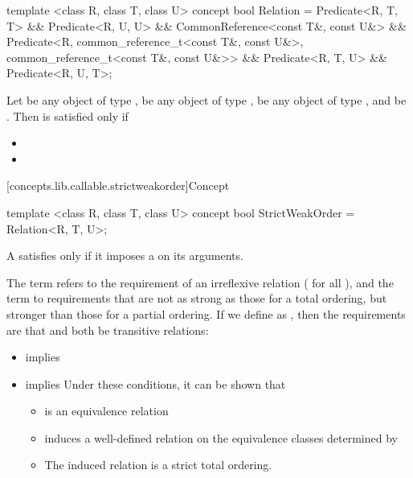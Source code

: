 %
\begin{itemdecl}
template <class R, class T, class U>
concept bool Relation =
  Predicate<R, T, T> &&
  Predicate<R, U, U> &&
  CommonReference<const T&, const U&> &&
  Predicate<R,
    common_reference_t<const T&, const U&>,
    common_reference_t<const T&, const U&>> &&
  Predicate<R, T, U> &&
  Predicate<R, U, T>;
\end{itemdecl}

\begin{itemdescr}
\pnum
Let  be any object of type ,  be any
object of type ,  be any
object of type , and  be
.
Then  is satisfied only if

\begin{itemize}
\item {}
\item {}
\end{itemize}
\end{itemdescr}

[concepts.lib.callable.strictweakorder]{Concept }

%
\begin{itemdecl}
template <class R, class T, class U>
concept bool StrictWeakOrder = Relation<R, T, U>;
\end{itemdecl}

\begin{itemdescr}
\pnum
A  satisfies  only if
it imposes a  on its arguments.

\pnum
The term
refers to the
requirement of an irreflexive relation ( for all ),
and the term
to requirements that are not as strong as
those for a total ordering,
but stronger than those for a partial
ordering.
If we define
as
,
then the requirements are that
and
both be transitive  relations:

\begin{itemize}
\item
{}
implies
\item
{}
implies
\enternote
Under these conditions, it can be shown that
\begin{itemize}
\item
{}
is an equivalence relation
\item
{}
induces a well-defined relation on the equivalence
classes determined by
\item
The induced relation is a strict total ordering.
\exitnote
\end{itemize}
\end{itemize}
\end{itemdescr}
